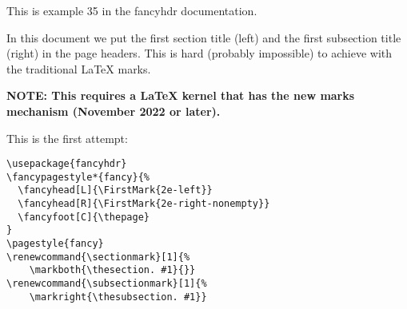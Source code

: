 \documentclass{article}
\renewcommand{\sectionmark}[1]{%
    \markboth{\thesection. #1}{}}
\renewcommand{\subsectionmark}[1]{%
    \markright{\thesubsection. #1}}
\begin{document}
\pagestyle{intro}
\thispagestyle{contents}
\tableofcontents

\bigskip

\noindent
\begin{boxedminipage}{\textwidth}
This is example 35 in the \textsf{fancyhdr} documentation.

In this document we put the first section title (left) and the first subsection title (right) in the page headers. This is hard (probably impossible) to achieve with the traditional \LaTeX{} marks.

\textbf{NOTE: This requires a \LaTeX{} kernel that has the new marks mechanism (November 2022 or later).}

\medskip

This is the first attempt:

\begin{verbatim}
\usepackage{fancyhdr}
\fancypagestyle*{fancy}{%
  \fancyhead[L]{\FirstMark{2e-left}}
  \fancyhead[R]{\FirstMark{2e-right-nonempty}}
  \fancyfoot[C]{\thepage}
}
\pagestyle{fancy}
\renewcommand{\sectionmark}[1]{%
    \markboth{\thesection. #1}{}}
\renewcommand{\subsectionmark}[1]{%
    \markright{\thesubsection. #1}}
\end{verbatim}
\end{boxedminipage}
\end{document}
